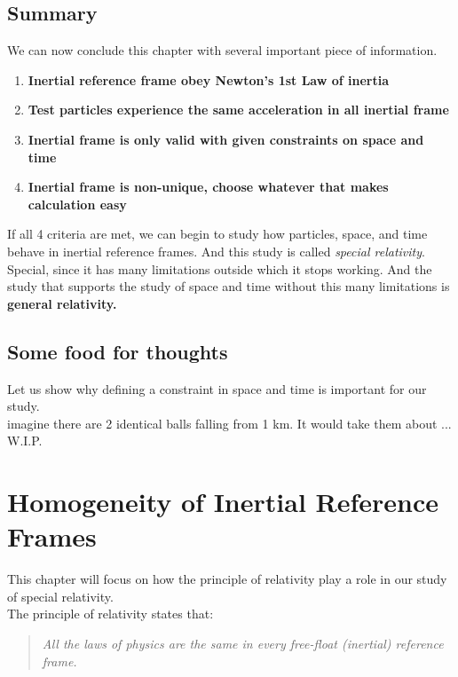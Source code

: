 \documentclass[12pt]{book}
\begin{document}
\subsection{Summary}
We can now conclude this chapter with several important piece of information.
\begin{enumerate}
    \item \textbf{Inertial reference frame obey Newton's 1st Law of inertia}
    \item \textbf{Test particles experience the same acceleration in all inertial frame}
    \item \textbf{Inertial frame is only valid with given constraints on space and time}
    \item \textbf{Inertial frame is non-unique, choose whatever that makes calculation easy}
\end{enumerate}
If all 4 criteria are met, we can begin to study how particles, space, and time behave in inertial reference frames. And this study is called \textit{special relativity}. Special, since it has many limitations outside which it stops working. And the study that supports the study of space and time without this many limitations is \textbf{general relativity.}

\subsection{Some food for thoughts}
Let us show why defining a constraint in space and time is important for our study.\\
\newline
imagine there are 2 identical balls falling from 1 km. It would take them about ... W.I.P.

\section{Homogeneity of Inertial Reference Frames}
This chapter will focus on how the principle of relativity play a role in our study of special relativity.\\
\newline
The principle of relativity states that:
\begin{quote}
    \textit{All the laws of physics are the same in every free-float (inertial) reference frame.}
\end{quote}
\end{document}
